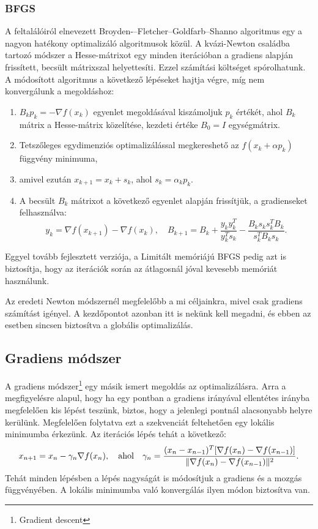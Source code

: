 \subsubsection{BFGS}
A feltalálóiról elnevezett Broyden-–Fletcher--Goldfarb--Shanno algoritmus egy a nagyon hatékony optimalizáló algoritmusok közül. A kvázi-Newton családba tartozó módszer a Hesse-mátrixot egy minden iterációban a gradiens alapján frissített, becsült mátrixszal helyettesíti. Ezzel számítási költséget spórolhatunk. A módosított algoritmus a következő lépéseket hajtja végre, míg nem konvergálunk a megoldáshoz:
\begin{enumerate}
	\item $B_kp_k=-\nabla f(x_k)$ egyenlet megoldásával kiszámoljuk $p_k$ értékét, ahol $B_k$ mátrix a Hesse-mátrix közelítése, kezdeti értéke $B_0=I$ egységmátrix.
	\item Tetszőleges egydimenziós optimalizálással megkereshető az $f(x_k+\alpha p_k)$ függvény minimuma,
	\item amivel ezután $x_{k+1}=x_k+s_k$, ahol $s_k=\alpha _kp_k$.
	\item A becsült $B_k$ mátrixot a következő egyenlet alapján frissítjük, a gradienseket felhasználva:
	$$y_k=\nabla f(x_{k+1})-\nabla f(x_k), \quad B_{k+1}=B_k+\frac{y_ky_k^T}{y_k^Ts_k}-\frac{B_ks_ks_k^TB_k}{s_k^TB_ks_k}.$$
\end{enumerate}

Eggyel tovább fejlesztett verziója, a Limitált memóriájú BFGS pedig azt is biztosítja, hogy az iterációk során az átlagosnál jóval kevesebb memóriát használunk.

Az eredeti Newton módszernél megfelelőbb a mi céljainkra, mivel csak gradiens számítást igényel. A kezdőpontot azonban itt is nekünk kell megadni, és ebben az esetben sincsen biztosítva a globális optimalizálás.

\subsection{Gradiens módszer}

A gradiens módszer\footnote{Gradient descent} egy másik ismert megoldás az optimalizálásra. Arra a megfigyelésre alapul, hogy ha egy pontban a gradiens irányával ellentétes irányba megfelelően kis lépést teszünk, biztos, hogy a jelenlegi pontnál alacsonyabb helyre kerülünk. Megfelelően folytatva ezt a szekvenciát feltehetően egy lokális minimumba érkezünk. Az iterációs lépés tehát a következő:
$$x_{n+1}=x_n-\gamma _n\nabla f(x_n),\quad \textnormal{ahol}\quad \gamma _n=\frac{(x_n-x_{n-1})^T[\nabla f(x_n)-\nabla f(x_{n-1})]}{\|\nabla f(x_n)-\nabla f(x_{n-1})\|^2}.$$
Tehát minden lépésben a lépés nagyságát is módosítjuk a gradiens és a mozgás függvényében. A lokális minimumba való konvergálás ilyen módon biztosítva van. 

